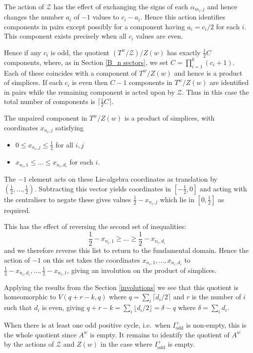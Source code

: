 \documentclass[11pt,a4paper]{article}
\def\mbar{\overline{m}}
\def\cZ{\mathcal{Z}}
\def\cZ{{\mathcal Z}}
\def\mbar{\overline{m}}
\def\odd{\mathrm{odd}}
\begin{document}
The action of $\cZ$ has the effect of exchanging the signs of each $\alpha_{\mbar_i,j}$ and hence changes the number $a_i$ of $-1$ values to $c_i-a_i$. Hence this action identifies components in pairs except possibly for a component having $a_i=c_i/2$ for each $i$.  This component exists precisely when all $c_i$ values are even.

Hence if any $c_i$ is odd, the quotient $(T^w/\cZ)/Z(w)$ has exactly \mbox{$\frac 12 C$} components, where, as in Section \ref{B_n sectors}, we set $C=\prod\limits_{i=1}^k(c_i+1)$.  Each of these coincides with a component of $T^w/Z(w)$ and hence is a product of simplices. If each $c_i$ is even then $C-1$ components in $T^w/Z(w)$ are identified in pairs while the remaining component is acted upon by $\cZ$. Thus in this case the total number of components is $\lceil \frac 12 C\rceil$.

The unpaired component in  $T^w/Z(w)$ is a product of simplices, with coordinates $x_{n_i,j}$ satisfying
\begin{itemize}
    \item $0\leq x_{n_i,j}\leq \frac 12$ for all $i,j$
    \item $x_{n_i,1}\leq \dots \leq x_{n_i,d_i}$ for each $i$.
\end{itemize}
The $-1$ element acts on these Lie-algebra coordinates as translation by $(\frac12,\dots,\frac 12)$. Subtracting this vector yields coordinates in $[-\frac 12,0]$ and acting with the centraliser to negate these gives values $\frac 12-x_{n_i,j}$ which lie in $[0,\frac 12]$ as required.  

This has the effect of reversing the second set of inequalities:
\[
\frac 12-x_{n_i,1}\geq \dots \geq \frac 12-x_{n_i,d_i}
\]
and we therefore reverse this list to return to the fundamental domain.  Hence the action of $-1$ on this set takes the coordinates $x_{n_i,1}, \dots, x_{n_i,d_i}$ to $\frac 12-x_{n_i,d_i},\dots,\frac 12-x_{n_i,1}$, giving an involution on the product of simplices.










Applying the results from the Section \ref{involutions} we see that this quotient is homeomorphic to $V(q+r-k,q)$ where $q=\sum_i \lceil d_i/2\rceil$ and $r$ is the number of $i$ such that $d_i$ is even, giving $q+r-k=\sum_i \lfloor d_i/2\rfloor = \delta-q$ where $\delta=\sum_i d_i$.

When there is at least one odd positive cycle, i.e.\ when $I^+_{\odd}$ is non-empty, this is the whole quotient since $A^w$ is empty.  It remains to identify the quotient of $A^w$ by the actions of $\cZ$ and $Z(w)$ in the case where $I^+_{\odd}$ is empty.
\end{document}

